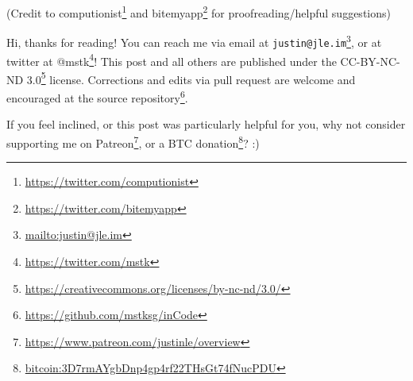 \documentclass[]{article}
\renewcommand{\href}[2]{#2\footnote{\url{#1}}}
\begin{document}
(Credit to \href{https://twitter.com/computionist}{computionist} and
\href{https://twitter.com/bitemyapp}{bitemyapp} for proofreading/helpful
suggestions)

Hi, thanks for reading! You can reach me via email at
\href{mailto:justin@jle.im}{\nolinkurl{justin@jle.im}}, or at twitter at
\href{https://twitter.com/mstk}{@mstk}! This post and all others are published
under the \href{https://creativecommons.org/licenses/by-nc-nd/3.0/}{CC-BY-NC-ND
3.0} license. Corrections and edits via pull request are welcome and encouraged
at \href{https://github.com/mstksg/inCode}{the source repository}.

If you feel inclined, or this post was particularly helpful for you, why not
consider \href{https://www.patreon.com/justinle/overview}{supporting me on
Patreon}, or a \href{bitcoin:3D7rmAYgbDnp4gp4rf22THsGt74fNucPDU}{BTC donation}?
:)
\end{document}
